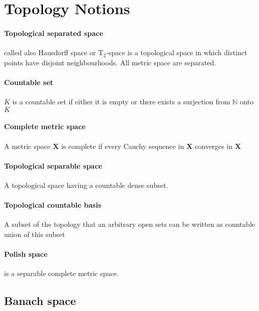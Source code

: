 \documentclass[a4paper,10pt]{article}
\begin{document}
\begin{center}\end{center}
\section{Topology Notions}
\paragraph{Topological separated space} called also Hausdorff space or T$_2$-space is a topological space in which distinct points have disjoint neighbourhoods. All metric space are separated.

\paragraph{Countable set} $K$ is a countable set if either it is empty or there exists a surjection from $\mathbb{N}$ onto $K$ 

\paragraph{Complete metric space} A metric space $\textbf{X}$ is complete if every Cauchy sequence in $\textbf{X}$ converges in $\textbf{X}$ 

\paragraph{Topological separable space} A topological space having a countable dense subset.

\paragraph{Topological countable basis} A subset of the topology that an arbitrary open sets can be written as countable union of this subset

\paragraph{Polish space} is a separable complete metric space.

\subsection{Banach space}
\end{document}
